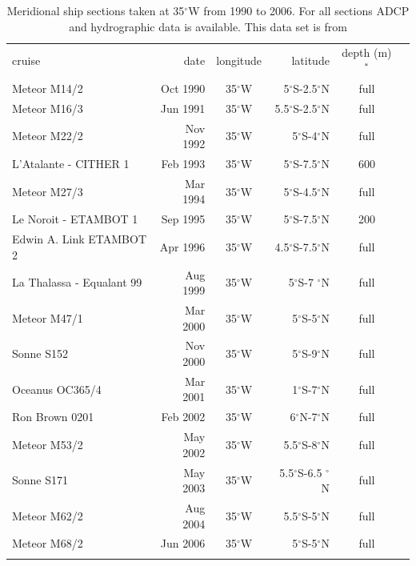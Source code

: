 \documentclass[os, manuscript]{copernicus}
\begin{document}
	\clearpage
	\begin{table}[t]
		\caption{Meridional ship sections taken at 35$^{\circ}$W from 1990 to 2006. For all sections ADCP and hydrographic data is available. This data set is from \cite{Hormann2007}}
		\centering
		\begin{tabular}{lrcrcc}
			\tophline
			cruise & date & longitude&latitude & depth (m)$ ^* $ \\
			\middlehline
			Meteor M14/2 & Oct 1990 & 35$^{\circ}$W & 5$^{\circ}$S-2.5$^{\circ}$N & full & \\
			Meteor M16/3 & Jun 1991& 35$^{\circ}$W & 5.5$^{\circ}$S-2.5$^{\circ}$N & full & \\
			Meteor M22/2 & Nov 1992& 35$^{\circ}$W & 5$^{\circ}$S-4$^{\circ}$N & full & \\
			L’Atalante - CITHER 1 & Feb 1993& 35$^{\circ}$W & 5$^{\circ}$S-7.5$^{\circ}$N & 600 & \\
			Meteor M27/3 & Mar 1994& 35$^{\circ}$W & 5$^{\circ}$S-4.5$^{\circ}$N & full & \\
			Le Noroit - ETAMBOT 1 & Sep 1995& 35$^{\circ}$W & 5$^{\circ}$S-7.5$^{\circ}$N & 200 & \\
			Edwin A. Link ETAMBOT 2 & Apr 1996& 35$^{\circ}$W & 4.5$^{\circ}$S-7.5$^{\circ}$N & full & \\
			La Thalassa - Equalant 99 & Aug 1999& 35$^{\circ}$W & 5$^{\circ}$S-7 $^{\circ}$N & full & \\
			Meteor M47/1 & Mar 2000& 35$^{\circ}$W & 5$^{\circ}$S-5$^{\circ}$N & full & \\
			Sonne S152 & Nov 2000& 35$^{\circ}$W & 5$^{\circ}$S-9$^{\circ}$N & full & \\
			Oceanus OC365/4 & Mar 2001& 35$^{\circ}$W & 1$^{\circ}$S-7$^{\circ}$N & full & \\
			Ron Brown 0201 & Feb 2002& 35$^{\circ}$W & 6$^{\circ}$N-7$^{\circ}$N & full & \\
			Meteor M53/2 & May 2002& 35$^{\circ}$W & 5.5$^{\circ}$S-8$^{\circ}$N & full & \\
			Sonne S171 & May 2003& 35$^{\circ}$W & 5.5$^{\circ}$S-6.5 $^{\circ}$N& full & \\
			Meteor M62/2 & Aug 2004& 35$^{\circ}$W & 5.5$^{\circ}$S-5$^{\circ}$N & full & \\
			Meteor M68/2 & Jun 2006& 35$^{\circ}$W & 5$^{\circ}$S-5$^{\circ}$N& full & \\	
			\bottomhline
		\end{tabular}
		\label{tab_cruises_35W}
	\end{table}
\end{document}
